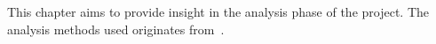 This chapter aims to provide insight in the analysis phase of the project. The analysis methods used originates from~\cite{mathiassen2001objektorienteret}.